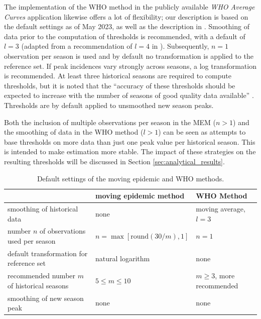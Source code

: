 \documentclass{article}
\begin{document}
The implementation of the WHO method in the publicly available \textit{WHO Average Curves} application \citep{WHO2023} likewise offers a lot of flexibility; our description is based on the default settings as of May 2023, as well as the description in \cite{WHO2014}. Smoothing of data prior to the computation of thresholds is recommended, with a default of $l = 3$ (adapted from a recommendation of $l = 4$ in \citealt[p68]{WHO2014}). Subsequently, $n = 1$ observation per season is used and by default no transformation is applied to the reference set. If peak incidences vary strongly across seasons, a log transformation is recommended. At least three historical seasons are required to compute thresholds, but it is noted that the ``accuracy of these thresholds should be expected to increase with the number of seasons of good quality data available'' \cite[p22]{WHO2023}. %
Thresholds are by default applied to unsmoothed new season peaks.

Both the inclusion of multiple observations per season in the MEM ($n > 1$) and the smoothing of data in the WHO method ($l > 1$) can be seen as attempts to base thresholds on more data than just one peak value per historical season. This is intended to make estimation more stable. The impact of these strategies on the resulting thresholds will be discussed in Section \ref{sec:analytical_results}.




\begin{table}[h]
\caption{Default settings of the moving epidemic and WHO methods.}
\label{tab:differences}
\begin{center}
\footnotesize
\begin{tabular}{lll}
\toprule
& moving epidemic method & WHO Method \\
\midrule
smoothing of historical data & none & moving average, $l = 3$\\
number $n$ of observations used per season & $n = \max[\text{round}(30/m), 1]$ & $n = 1$\\
default transformation for reference set & natural logarithm & none\\
recommended number $m$ of historical seasons & $5 \leq m \leq 10$ & $m \geq 3$, more recommended\\
smoothing of new season peak & none & none\\
\bottomrule
\end{tabular}
\end{center}

\end{table}
\end{document}
